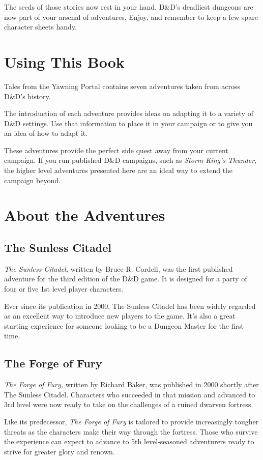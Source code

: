 \documentclass[10pt,a4paper,twoside,bg=print,twocolumn,openany,nodeprecatedcode]{dndbook}
\begin{document}
The seeds of those stories now rest in your hand. D\&D's deadliest dungeons are now part of your arsenal of adventures. Enjoy, and remember to keep a few spare character sheets handy.

\section{Using This Book}
Tales from the Yawning Portal contains seven adventures taken from across D\&D's history.

The introduction of each adventure provides ideas on adapting it to a variety of D\&D settings. Use that information to place it in your campaign or to give you an idea of how to adapt it.

These adventures provide the perfect side quest away from your current campaign. If you run published D\&D campaigns, such as \textit{Storm King's Thunder}, the higher level adventures presented here are an ideal way to extend the campaign beyond.

\section{About the Adventures}
\subsection{The Sunless Citadel}
\textit{The Sunless Citadel,} written by Bruce R. Cordell, was the first published adventure for the third edition of the D\&D game. It is designed for a party of four or five 1st level player characters.

Ever since its publication in 2000, The Sunless Citadel has been widely regarded as an excellent way to introduce new players to the game. It's also a great starting experience for someone looking to be a Dungeon Master for the first time.

\subsection{The Forge of Fury}
\textit{The Forge of Fury,} written by Richard Baker, was published in 2000 shortly after The Sunless Citadel. Characters who succeeded in that mission and advanced to 3rd level were now ready to take on the challenges of a ruined dwarven fortress.

Like its predecessor, \textit{The Forge of Fury} is tailored to provide increasingly tougher threats as the characters make their way through the fortress. Those who survive the experience can expect to advance to 5th level-seasoned adventurers ready to strive for greater glory and renown.
\end{document}
